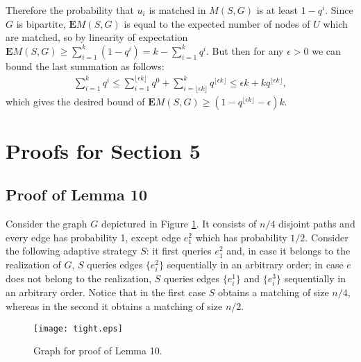\documentclass[12pt]{article}
\newcommand{\Mf}[2]{M(#1,#2)}
\newcommand{\EMf}[2]{\mathbf{E}M(#1,#2)}
\newcommand{\tightSampling}[0]{10}
\begin{document}
			Therefore the probability that $u_i$ is matched in $\Mf{S}{G}$ is at least $1 - q^i$. Since $G$ is bipartite, $\EMf{S}{G}$ is equal to the expected number of nodes of $U$ which are matched, so by linearity of expectation $\EMf{S}{G} \ge \sum_{i = 1}^k (1 - q^i) = k - \sum_{i = 1}^k q^i$. But then for any $\epsilon > 0$ we can bound the last summation as follows:
\begin{eqnarray*}
				\sum_{i = 1}^k q^i \le \sum_{i = 1}^{\lfloor \epsilon k \rfloor} q^0 + \sum_{i = \lfloor \epsilon k \rfloor}^k q^{\lfloor \epsilon k \rfloor} \le \epsilon k + k q^{\lfloor \epsilon k \rfloor},
			\end{eqnarray*}
		which gives the desired bound of $\EMf{S}{G} \ge (1 - q^{\lfloor \epsilon k \rfloor} - \epsilon) k$.	


\section{Proofs for Section 5}

	\subsection{Proof of Lemma \tightSampling}
			
		Consider the graph $G$ depictured in Figure \ref{fig:tightSampling}. It consists of $n/4$ disjoint paths and every edge has probability 1, except edge $e_1^2$ which has probability $1/2$. Consider the following adaptive strategy $S$: it first queries $e_1^2$ and, in case it belongs to the realization of $G$, $S$ queries edges $\{e^2_i\}$ sequentially in an arbitrary order; in case $e$ does not belong to the realization, $S$ queries edges  $\{e^1_i\}$ and $\{e^3_i\}$ sequentially in an arbitrary order. Notice that in the first case $S$ obtains a matching of size $n/4$, whereas in the second it obtains a matching of size $n/2$. 

\begin{figure}[htbp]
	\centering
		\texttt{[image: tight.eps]}
	\caption{Graph for proof of Lemma \tightSampling.}
	\label{fig:tightSampling}
\end{figure}
			
\end{document}

